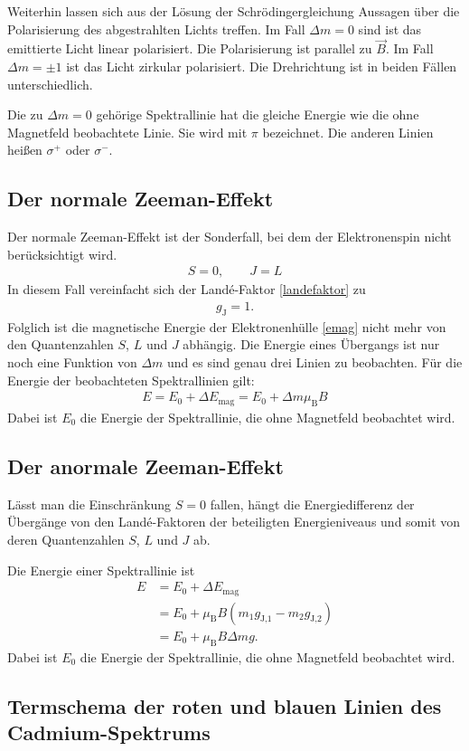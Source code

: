 Weiterhin lassen sich aus der Lösung der Schrödingergleichung Aussagen über die Polarisierung des abgestrahlten Lichts treffen.
Im Fall $\Delta m = 0$ sind ist das emittierte Licht linear polarisiert.
Die Polarisierung ist parallel zu $\vec{B}$.
Im Fall $\Delta m = \pm 1$ ist das Licht zirkular polarisiert.
Die Drehrichtung ist in beiden Fällen unterschiedlich.

Die zu $\Delta m = 0$ gehörige Spektrallinie hat die gleiche Energie wie die ohne Magnetfeld beobachtete Linie.
Sie wird mit $\pi$ bezeichnet.
Die anderen Linien heißen $\sigma^+$ oder $\sigma^-$.

\subsection{Der normale Zeeman-Effekt}
Der normale Zeeman-Effekt ist der Sonderfall, bei dem der Elektronenspin nicht berücksichtigt wird.
\begin{align}
	S = 0, \quad \quad J = L
\end{align}
In diesem Fall vereinfacht sich der Landé-Faktor \eqref{landefaktor} zu
\begin{align}
	g_\text{J} = 1.
\end{align}
Folglich ist die magnetische Energie der Elektronenhülle \eqref{emag} nicht mehr von den Quantenzahlen $S$, $L$ und $J$ abhängig.
Die Energie eines Übergangs ist nur noch eine Funktion von $\Delta m$ und es sind genau drei Linien zu beobachten.
Für die Energie der beobachteten Spektrallinien gilt:
\begin{align}
	E = E_0 + \Delta E_\text{mag} =  E_0 + \Delta m \mu_\text{B} B
\end{align}
Dabei ist $E_0$ die Energie der Spektrallinie, die ohne Magnetfeld beobachtet wird.

\subsection{Der anormale Zeeman-Effekt}
Lässt man die Einschränkung $S = 0$ fallen, hängt die Energiedifferenz der Übergänge von den Landé-Faktoren der beteiligten Energieniveaus und somit von deren Quantenzahlen $S$, $L$ und $J$ ab.

Die Energie einer Spektrallinie ist
\begin{align}
	E &= E_0 + \Delta E_\text{mag} \\
	&= E_0 + \mu_\text{B} B \left(m_1 g_\text{J,1} - m_2 g_\text{J,2} \right) \\
	&= E_0 + \mu_\text{B} B \Delta mg.
\end{align}
Dabei ist $E_0$ die Energie der Spektrallinie, die ohne Magnetfeld beobachtet wird.

\subsection{Termschema der roten und blauen Linien des Cadmium-Spektrums}